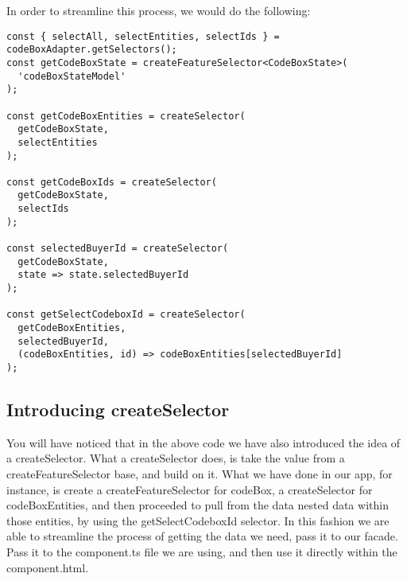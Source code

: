 In order to streamline this process, we would do the following:
\begin{lstlisting}
const { selectAll, selectEntities, selectIds } = codeBoxAdapter.getSelectors();
const getCodeBoxState = createFeatureSelector<CodeBoxState>(
  'codeBoxStateModel'
);

const getCodeBoxEntities = createSelector(
  getCodeBoxState,
  selectEntities
);

const getCodeBoxIds = createSelector(
  getCodeBoxState,
  selectIds
);

const selectedBuyerId = createSelector(
  getCodeBoxState,
  state => state.selectedBuyerId
);

const getSelectCodeboxId = createSelector(
  getCodeBoxEntities,
  selectedBuyerId,
  (codeBoxEntities, id) => codeBoxEntities[selectedBuyerId]
);
\end{lstlisting}


\subsection{Introducing createSelector}
You will have noticed that in the above code we have also introduced the idea
of a createSelector. What a createSelector does, is take the value from a
createFeatureSelector base, and build on it. What we have done in our app, for
instance, is create a createFeatureSelector for codeBox, a createSelector for
codeBoxEntities, and then proceeded to pull from the data nested data within
those entities, by using the getSelectCodeboxId selector. In this fashion we
are able to streamline the process of getting the data we need, pass it to our
facade. Pass it to the component.ts file we are using, and then use it directly
within the component.html.
